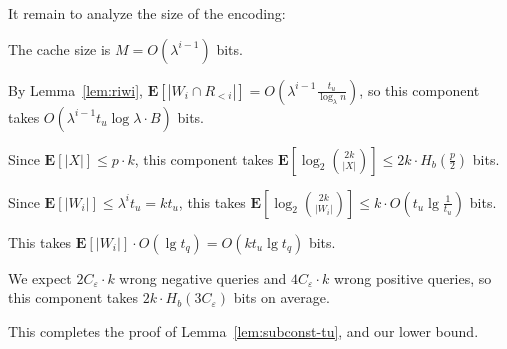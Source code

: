 \documentclass[letterpaper,11pt]{article}
\newenvironment{enumerate*}{\vspace{-1ex}\begin{enumerate}\setlength{\itemsep}{-0.5ex}\setlength{\parsep}{0pt}}{\end{enumerate}}
\newcommand{\eps}{\varepsilon}
\newcommand{\E}{\mathbf{E}}
\begin{document}
It remain to analyze the size of the encoding:
\begin{enumerate*}
\item The cache size is $M = O(\lambda^{i-1})$ bits.

\item By Lemma~\ref{lem:riwi}, $\E[|W_i \cap R_{<i}|] =
  O(\lambda^{i-1} \frac{t_u} {\log_\lambda n})$, so this component
  takes $O(\lambda^{i-1} t_u \log \lambda \cdot B)$ bits.

\item Since $\E[|X|] \le p\cdot k$, this component takes $\E[\log_2
  \binom{2k}{|X|}] \le 2k \cdot H_b(\frac{p}{2})$ bits.

\item Since $\E[|W_i|] \le \lambda^i t_u = kt_u$, this takes $\E[ \log_2
  \binom{2k}{|W_i|} ] \le k \cdot O(t_u \lg \frac{1}{t_u})$ bits.

\item This takes $\E[|W_i|] \cdot O(\lg t_q) = O(k t_u \lg t_q)$ bits.

\item We expect $2C_\eps\cdot k$ wrong negative queries and $4C_\eps
  \cdot k$ wrong positive queries, so this component takes $2k \cdot
  H_b(3 C_\eps)$ bits on average.
\end{enumerate*}

\noindent
This completes the proof of Lemma~\ref{lem:subconst-tu}, and our
lower bound.
\end{document}
